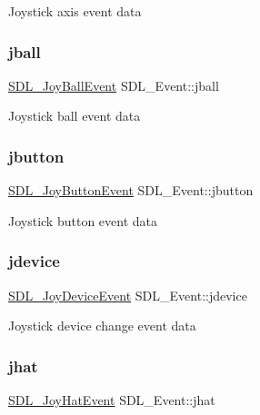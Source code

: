 Joystick axis event data \mbox{\label{union_s_d_l___event_ae433f511e3383d17f8fe02df745ee8f8}} 
\subsubsection{\texorpdfstring{jball}{jball}}
{\footnotesize\ttfamily \hyperlink{struct_s_d_l___joy_ball_event}{S\+D\+L\+\_\+\+Joy\+Ball\+Event} S\+D\+L\+\_\+\+Event\+::jball}

Joystick ball event data \mbox{\label{union_s_d_l___event_a591104d64903ae1cf70874fb5d3124ff}} 
\subsubsection{\texorpdfstring{jbutton}{jbutton}}
{\footnotesize\ttfamily \hyperlink{struct_s_d_l___joy_button_event}{S\+D\+L\+\_\+\+Joy\+Button\+Event} S\+D\+L\+\_\+\+Event\+::jbutton}

Joystick button event data \mbox{\label{union_s_d_l___event_a17514dc19a846ea1b5fbe44123700c4c}} 
\subsubsection{\texorpdfstring{jdevice}{jdevice}}
{\footnotesize\ttfamily \hyperlink{struct_s_d_l___joy_device_event}{S\+D\+L\+\_\+\+Joy\+Device\+Event} S\+D\+L\+\_\+\+Event\+::jdevice}

Joystick device change event data \mbox{\label{union_s_d_l___event_a421b40e0f8e01f181c8d5548cff1dd1d}} 
\subsubsection{\texorpdfstring{jhat}{jhat}}
{\footnotesize\ttfamily \hyperlink{struct_s_d_l___joy_hat_event}{S\+D\+L\+\_\+\+Joy\+Hat\+Event} S\+D\+L\+\_\+\+Event\+::jhat}

